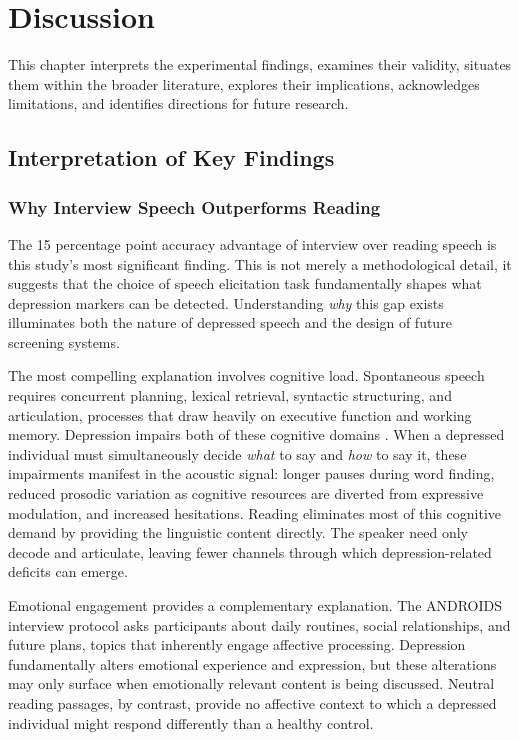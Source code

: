 \chapter{Discussion}

This chapter interprets the experimental findings, examines their validity, situates them within the broader literature, explores their implications, acknowledges limitations, and identifies directions for future research.

\section{Interpretation of Key Findings}

\subsection{Why Interview Speech Outperforms Reading}

The 15 percentage point accuracy advantage of interview over reading speech is this study's most significant finding. This is not merely a methodological detail, it suggests that the choice of speech elicitation task fundamentally shapes what depression markers can be detected. Understanding \textit{why} this gap exists illuminates both the nature of depressed speech and the design of future screening systems.

The most compelling explanation involves cognitive load. Spontaneous speech requires concurrent planning, lexical retrieval, syntactic structuring, and articulation, processes that draw heavily on executive function and working memory. Depression impairs both of these cognitive domains \cite{rock2014cognitive}. When a depressed individual must simultaneously decide \textit{what} to say and \textit{how} to say it, these impairments manifest in the acoustic signal: longer pauses during word finding, reduced prosodic variation as cognitive resources are diverted from expressive modulation, and increased hesitations. Reading eliminates most of this cognitive demand by providing the linguistic content directly. The speaker need only decode and articulate, leaving fewer channels through which depression-related deficits can emerge.

Emotional engagement provides a complementary explanation. The ANDROIDS interview protocol asks participants about daily routines, social relationships, and future plans, topics that inherently engage affective processing. Depression fundamentally alters emotional experience and expression, but these alterations may only surface when emotionally relevant content is being discussed. Neutral reading passages, by contrast, provide no affective context to which a depressed individual might respond differently than a healthy control.

